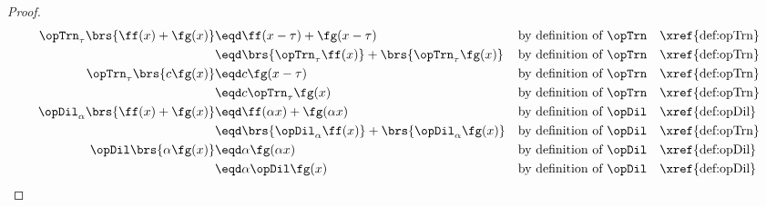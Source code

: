 \begin{theorem}
\label{thm:opTD_linear}
\end{theorem}
\begin{proof}
\begin{align*}
    \opTrn_\tau\brs{\ff(x)+\fg(x)}
      &\eqd \ff(x-\tau)+\fg(x-\tau)
      && \text{by definition of $\opTrn$}
      && \text{\xref{def:opTrn}}
    \\&\eqd \brs{\opTrn_\tau\ff(x)} + \brs{\opTrn_\tau\fg(x)}
      && \text{by definition of $\opTrn$}
      && \text{\xref{def:opTrn}}
    \\
    \opTrn_\tau\brs{c\fg(x)}
      &\eqd c\fg(x-\tau)
      && \text{by definition of $\opTrn$}
      && \text{\xref{def:opTrn}}
    \\&\eqd c\opTrn_\tau\fg(x)
      && \text{by definition of $\opTrn$}
      && \text{\xref{def:opTrn}}
    \\
    \opDil_\alpha\brs{\ff(x)+\fg(x)}
      &\eqd \ff(\alpha x)+\fg(\alpha x)
      && \text{by definition of $\opDil$}
      && \text{\xref{def:opDil}}
    \\&\eqd \brs{\opDil_\alpha\ff(x)} + \brs{\opDil_\alpha\fg(x)}
      && \text{by definition of $\opDil$}
      && \text{\xref{def:opTrn}}
    \\
    \opDil\brs{\alpha\fg(x)}
      &\eqd \alpha\fg(\alpha x)
      && \text{by definition of $\opDil$}
      && \text{\xref{def:opDil}}
    \\&\eqd \alpha\opDil\fg(x)
      && \text{by definition of $\opDil$}
      && \text{\xref{def:opDil}}
\end{align*}
\end{proof}

